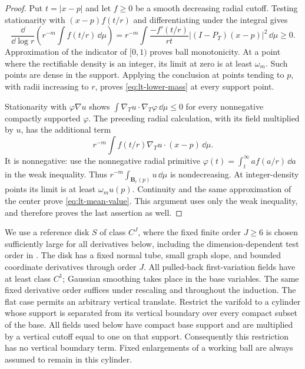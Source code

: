 \begin{proof}
Put $t=|x-p|$ and let $f\ge0$ be a smooth decreasing radial cutoff.  Testing
stationarity with $(x-p)f(t/r)$ and differentiating under the integral gives
\[
 \frac{\dd}{\dd\log r}\left(r^{-m}\int f(t/r)\,\dd\mu\right)
 =r^{-m}\int \frac{-f'(t/r)}{rt}
                |(I-P_T)(x-p)|^2\,\dd\mu\ge0.
\]
Approximation of the indicator of $[0,1)$ proves ball monotonicity.  At a point
where the rectifiable density is an integer, its limit at zero is at least
$\omega_m$.  Such points are dense in the support.  Applying the conclusion
at points tending to $p$, with radii increasing to $r$, proves
\eqref{eq:lt-lower-mass} at every support point.

Stationarity with $\varphi\nabla u$ shows
$\int\nabla_Tu\cdot\nabla_T\varphi\,\dd\mu\le0$ for every nonnegative
compactly supported $\varphi$.  The preceding radial calculation, with its
field multiplied by $u$, has the additional term
\[
 r^{-m}\int f(t/r)\nabla_Tu\cdot(x-p)\,\dd\mu.
\]
It is nonnegative: use the nonnegative radial primitive
$\varphi(t)=\int_t^\infty a f(a/r)\,\dd a$ in the weak inequality.
Thus $r^{-m}\int_{\mathbf B_r(p)}u\,\dd\mu$ is nondecreasing.
At integer-density points its limit is at least $\omega_m u(p)$.
Continuity and the same approximation of the center prove
\eqref{eq:lt-mean-value}.  This argument uses only the weak inequality, and
therefore proves the last assertion as well.
\end{proof}

We use a reference disk $S$ of class $C^J$, where the fixed finite
order $J\ge6$ is chosen sufficiently large for all derivatives below,
including the dimension-dependent test order in .
The disk has a fixed normal tube, small graph slope, and bounded coordinate
derivatives through order $J$.  All pulled-back first-variation fields
have at least class $C^1$; Gaussian smoothing takes place in the base
variables.  The same fixed derivative order suffices under rescaling and
throughout the induction.  The flat case permits an arbitrary
vertical translate.  Restrict the varifold to a cylinder whose support is
separated from its vertical boundary over every compact subset of the base.
All fields used below have compact base support and are multiplied by a
vertical cutoff equal to one on that support.  Consequently this restriction
has no vertical boundary term.  Fixed enlargements of a working ball are
always assumed to remain in this cylinder.

